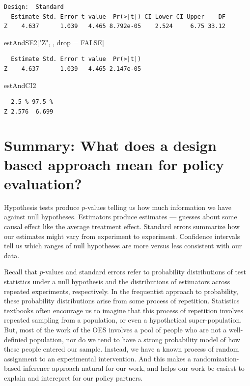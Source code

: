 \documentclass[
  12pt,
]{book}
\newenvironment{Shaded}{\begin{snugshade}}{\end{snugshade}}
\newcommand{\NormalTok}[1]{#1}
\newcommand{\OtherTok}[1]{\textcolor[rgb]{0.56,0.35,0.01}{#1}}
\newcommand{\StringTok}[1]{\textcolor[rgb]{0.31,0.60,0.02}{#1}}
\theoremstyle{definition}
\theoremstyle{definition}
\theoremstyle{definition}
\theoremstyle{remark}
\begin{document}
\begin{verbatim}
Design:  Standard 
  Estimate Std. Error t value  Pr(>|t|) CI Lower CI Upper    DF
Z    4.637      1.039   4.465 8.792e-05    2.524     6.75 33.12
\end{verbatim}

\begin{Shaded}
\begin{Highlighting}[]
\NormalTok{estAndSE2[}\StringTok{"Z"}\NormalTok{, , drop =}\StringTok{ }\OtherTok{FALSE}\NormalTok{]}
\end{Highlighting}
\end{Shaded}

\begin{verbatim}
  Estimate Std. Error t value  Pr(>|t|)
Z    4.637      1.039   4.465 2.147e-05
\end{verbatim}

\begin{Shaded}
\begin{Highlighting}[]
\NormalTok{estAndCI2}
\end{Highlighting}
\end{Shaded}

\begin{verbatim}
  2.5 % 97.5 %
Z 2.576  6.699
\end{verbatim}

\hypertarget{summary-what-does-a-design-based-approach-mean-for-policy-evaluation}{%
\section{Summary: What does a design based approach mean for policy
evaluation?}\label{summary-what-does-a-design-based-approach-mean-for-policy-evaluation}}

Hypothesis tests produce \(p\)-values telling us how much information we
have against null hypotheses. Estimators produce estimates --- guesses
about some causal effect like the average treatment effect. Standard
errors summarize how our estimates might vary from experiment to
experiment. Confidence intervals tell us which ranges of null hypotheses
are more versus less consistent with our data.

Recall that \(p\)-values and standard errors refer to probability
distributions of test statistics under a null hypothesis and the
distributions of estimators across repeated experiments, respectively.
In the frequentist approach to probability, these probability
distributions arise from some process of repetition. Statistics
textbooks often encourage us to imagine that this process of repetition
involves repeated sampling from a population, or even a hypothetical
super-population. But, most of the work of the OES involves a pool of
people who are not a well-definied population, nor do we tend to have a
strong probability model of how these people entered our sample.
Instead, we have a known process of random assignment to an experimental
intervention. And this makes a randomization-based inference approach
natural for our work, and helps our work be easiest to explain and
interepret for our policy partners.
\end{document}
